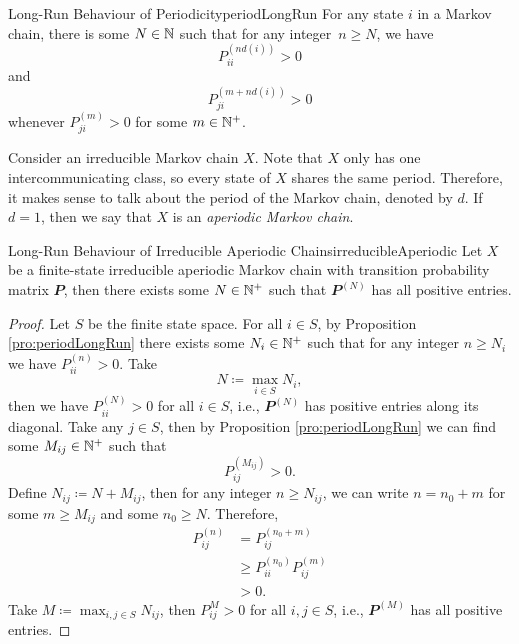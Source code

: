 \documentclass[math, code]{amznotes}
\theoremstyle{remark}
\begin{document}
\begin{probox}{Long-Run Behaviour of Periodicity}{periodLongRun}
    For any state $i$ in a Markov chain, there is some $N \in \mathbb{N}$ such that for any integer~$n \geq N$, we have 
    \begin{equation*}
        P^{\left(nd\left(i\right)\right)}_{ii} > 0
    \end{equation*}
    and 
    \begin{equation*}
        P_{ji}^{\left(m + nd\left(i\right)\right)} > 0
    \end{equation*}
    whenever $P_{ji}^{\left(m\right)} > 0$ for some $m \in \mathbb{N}^+$.
\end{probox}
Consider an irreducible Markov chain $X$. Note that $X$ only has one intercommunicating class, so every state of $X$ shares the same period. Therefore, it makes sense to talk about the period of the Markov chain, denoted by $d$. If $d = 1$, then we say that $X$ is an \textit{aperiodic Markov chain}.
\begin{probox}{Long-Run Behaviour of Irreducible Aperiodic Chains}{irreducibleAperiodic}
    Let $X$ be a finite-state irreducible aperiodic Markov chain with transition probability matrix $\mathbfit{P}$, then there exists some $N \in \mathbb{N}^+$ such that $\mathbfit{P}^{\left(N\right)}$ has all positive entries.
    \tcblower
    \begin{proof}
        Let $S$ be the finite state space. For all $i \in S$, by Proposition \ref{pro:periodLongRun} there exists some $N_i \in \mathbb{N}^+$ such that for any integer $n \geq N_i$ we have $P_{ii}^{\left(n\right)} > 0$. Take 
        \begin{equation*}
            N \coloneqq \max_{i \in S}N_i,
        \end{equation*}
        then we have $P_{ii}^{\left(N\right)} > 0$ for all $i \in S$, i.e., $\mathbfit{P}^{\left(N\right)}$ has positive entries along its diagonal. Take any $j \in S$, then by Proposition \ref{pro:periodLongRun} we can find some $M_{ij} \in \mathbb{N}^+$ such that 
        \begin{equation*}
            P_{ij}^{\left(M_{ij}\right)} > 0.
        \end{equation*}
        Define $N_{ij} \coloneqq N + M_{ij}$, then for any integer $n \geq N_{ij}$, we can write $n = n_0 + m$ for some $m \geq M_{ij}$ and some $n_0 \geq N$. Therefore,
        \begin{align*}
            P_{ij}^{\left(n\right)} & = P_{ij}^{\left(n_0 + m\right)} \\
            & \geq P_{ii}^{\left(n_0\right)}P_{ij}^{\left(m\right)} \\
            & > 0. 
        \end{align*}
        Take $M \coloneqq \max_{i, j \in S}N_{ij}$, then $P_{ij}^{M} > 0$ for all $i, j \in S$, i.e., $\mathbfit{P}^{\left(M\right)}$ has all positive entries.
    \end{proof}
\end{probox}
\end{document}
